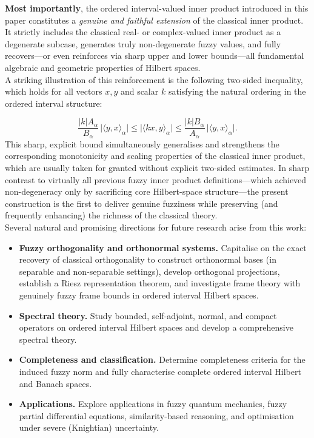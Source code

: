 \documentclass[preprint,12pt]{elsarticle}
\theoremstyle{definition}
\begin{document}
	\textbf{Most importantly}, the ordered interval-valued inner product introduced in this paper constitutes a \emph{genuine and faithful extension} of the classical inner product. It strictly includes the classical real- or complex-valued inner product as a degenerate subcase, generates truly non-degenerate fuzzy values, and fully recovers---or even reinforces via sharp upper and lower bounds---all fundamental algebraic and geometric properties of Hilbert spaces.\\
A striking illustration of this reinforcement is the following two-sided inequality, which holds for all vectors $x,y$ and scalar $k$ satisfying the natural ordering in the ordered interval structure:

	\[
\frac{|k| A_\alpha}{B_\alpha} \, \big|\langle y, x \rangle_\alpha \big|
\leq 
\big|\langle k x, y \rangle_\alpha \big|
\leq 
\frac{|k| B_\alpha}{A_\alpha} \, \big|\langle y, x \rangle_\alpha \big|.
\]
This sharp, explicit bound simultaneously generalises and strengthens the corresponding monotonicity and scaling properties of the classical inner product, which are usually taken for granted without explicit two-sided estimates. In sharp contrast to virtually all previous fuzzy inner product definitions---which achieved non-degeneracy only by sacrificing core Hilbert-space structure---the present construction is the first to deliver genuine fuzziness while preserving (and frequently enhancing) the richness of the classical theory.\\
Several natural and promising directions for future research arise from this work:
\begin{itemize}
	\item \textbf{Fuzzy orthogonality and orthonormal systems.} Capitalise on the exact recovery of classical orthogonality to construct orthonormal bases (in separable and non-separable settings), develop orthogonal projections, establish a Riesz representation theorem, and investigate frame theory with genuinely fuzzy frame bounds in ordered interval Hilbert spaces.
	
	\item \textbf{Spectral theory.} Study bounded, self-adjoint, normal, and compact operators on ordered interval Hilbert spaces and develop a comprehensive spectral theory.
	
	\item \textbf{Completeness and classification.} Determine completeness criteria for the induced fuzzy norm and fully characterise complete ordered interval Hilbert and Banach spaces.
	
	\item \textbf{Applications.} Explore applications in fuzzy quantum mechanics, fuzzy partial differential equations, similarity-based reasoning, and optimisation under severe (Knightian) uncertainty.
\end{itemize}
\end{document}
